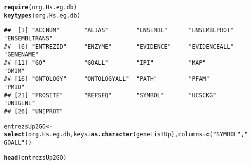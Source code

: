 \documentclass{article}\usepackage[]{graphicx}\usepackage[]{color}
\makeatletter
\newcommand{\hlstr}[1]{\textcolor[rgb]{0.192,0.494,0.8}{#1}}%
\newcommand{\hlstd}[1]{\textcolor[rgb]{0.345,0.345,0.345}{#1}}%
\newcommand{\hlkwb}[1]{\textcolor[rgb]{0.69,0.353,0.396}{#1}}%
\newcommand{\hlkwc}[1]{\textcolor[rgb]{0.333,0.667,0.333}{#1}}%
\newcommand{\hlkwd}[1]{\textcolor[rgb]{0.737,0.353,0.396}{\textbf{#1}}}%
\newenvironment{kframe}{%
 \def\at@end@of@kframe{}%
 \ifinner\ifhmode%
  \def\at@end@of@kframe{\end{minipage}}%
  \begin{minipage}{\columnwidth}%
 \fi\fi%
 \def\FrameCommand##1{\hskip\@totalleftmargin \hskip-\fboxsep
 \colorbox{shadecolor}{##1}\hskip-\fboxsep
     \hskip-\linewidth \hskip-\@totalleftmargin \hskip\columnwidth}%
 \MakeFramed {\advance\hsize-\width
   \@totalleftmargin\z@ \linewidth\hsize
   \@setminipage}}%
 {\par\unskip\endMakeFramed%
 \at@end@of@kframe}
\newenvironment{knitrout}{}{} %
\makeatother
\begin{document}
\begin{knitrout}
\color{fgcolor}\begin{kframe}
\begin{alltt}
\hlkwd{require}\hlstd{(org.Hs.eg.db)}
\hlkwd{keytypes}\hlstd{(org.Hs.eg.db)}
\end{alltt}
\begin{verbatim}
##  [1] "ACCNUM"       "ALIAS"        "ENSEMBL"      "ENSEMBLPROT"  "ENSEMBLTRANS"
##  [6] "ENTREZID"     "ENZYME"       "EVIDENCE"     "EVIDENCEALL"  "GENENAME"    
## [11] "GO"           "GOALL"        "IPI"          "MAP"          "OMIM"        
## [16] "ONTOLOGY"     "ONTOLOGYALL"  "PATH"         "PFAM"         "PMID"        
## [21] "PROSITE"      "REFSEQ"       "SYMBOL"       "UCSCKG"       "UNIGENE"     
## [26] "UNIPROT"
\end{verbatim}
\begin{alltt}
\hlstd{entrezsUp2GO} \hlkwb{<-} \hlkwd{select}\hlstd{(org.Hs.eg.db,} \hlkwc{keys} \hlstd{=} \hlkwd{as.character}\hlstd{(geneListUp),} \hlkwc{columns}\hlstd{=}\hlkwd{c}\hlstd{(}\hlstr{"SYMBOL"}\hlstd{,} \hlstr{"GOALL"}\hlstd{))}
\end{alltt}


{\ttfamily\noindent\itshape\color{messagecolor}{\#\# 'select()' returned 1:many mapping between keys and columns}}\begin{alltt}
\hlkwd{head}\hlstd{(entrezsUp2GO)}
\end{alltt}
\end{kframe}



\end{knitrout}
\end{document}

